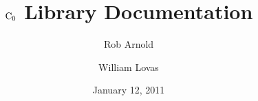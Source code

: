 \documentclass{article}
\title{${\rm C}_0$ Library Documentation}
\date{January 12, 2011}
\author{Rob Arnold \and William Lovas}
\begin{document}
\maketitle



\newcommand{\langtext}[1]{{\tt\small \lstinline|#1|}}
\newcommand{\langtextish}[1]{{\tt #1}}

\lstset{language=C++}


\end{document}
